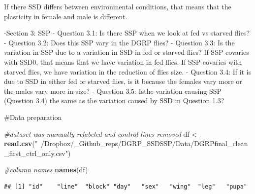 \documentclass[
]{article}
\newenvironment{Shaded}{\begin{snugshade}}{\end{snugshade}}
\newcommand{\CommentTok}[1]{\textcolor[rgb]{0.56,0.35,0.01}{\textit{#1}}}
\newcommand{\KeywordTok}[1]{\textcolor[rgb]{0.13,0.29,0.53}{\textbf{#1}}}
\newcommand{\NormalTok}[1]{#1}
\newcommand{\OperatorTok}[1]{\textcolor[rgb]{0.81,0.36,0.00}{\textbf{#1}}}
\newcommand{\StringTok}[1]{\textcolor[rgb]{0.31,0.60,0.02}{#1}}
\begin{document}
If there SSD differs between environmental conditions, that means that
the plasticity in female and male is different.

-Section 3: SSP - Question 3.1: Is there SSP when we look at fed vs
starved flies? - Question 3.2: Does this SSP vary in the DGRP flies? -
Question 3.3: Is the variation in SSP due to a variation in SSD in fed
or starved flies? If SSP covaries with SSD0, that means that we have
variation in fed flies. If SSP covaries with starved flies, we have
variation in the reduction of flies size. - Question 3.4: If it is due
to SSD in either fed or starved flies, is it because the females vary
more or the males vary more in size? - Question 3.5: Isthe variation
causing SSP (Question 3.4) the same as the variation caused by SSD in
Question 1.3?

\#Data preparation

\begin{Shaded}
\begin{Highlighting}[]
\CommentTok{#dataset was manually relabeled and control lines removed}
\NormalTok{df <-}\StringTok{ }\KeywordTok{read.csv}\NormalTok{(}\StringTok{"~/Dropbox/_Github_reps/DGRP_SSDSSP/Data/DGRPfinal_clean_first_ctrl_only.csv"}\NormalTok{)}

\CommentTok{#column names}
\KeywordTok{names}\NormalTok{(df)}
\end{Highlighting}
\end{Shaded}

\begin{verbatim}
## [1] "id"    "line"  "block" "day"   "sex"   "wing"  "leg"   "pupa"
\end{verbatim}

\begin{Shaded}
\end{Shaded}
\end{document}
